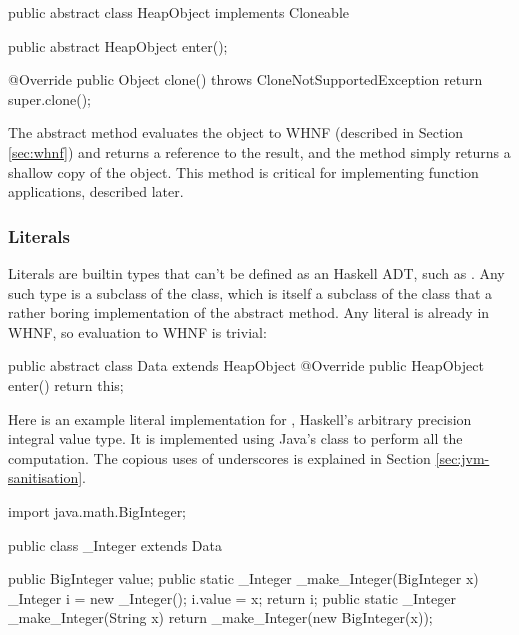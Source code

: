 \documentclass[dissertation.tex]{subfiles}
\begin{document}
{{        \begin{javafigure}
        public abstract class HeapObject implements Cloneable {
            public abstract HeapObject enter();

            @Override
            public Object clone() throws CloneNotSupportedException {
                return super.clone();
            }
        }
        \end{javafigure}

        The abstract  method evaluates the object to WHNF (described in Section \ref{sec:whnf}) and returns a reference to the result, and the  method simply returns a shallow copy of the object. This method is critical for implementing function applications, described later.

        \subsubsection{Literals}\label{sec:literals}
        {
            Literals are builtin types that can't be defined as an Haskell ADT, such as . Any such type is a subclass of the  class, which is itself a subclass of the  class that a rather boring implementation of the abstract  method. Any literal is already in WHNF, so evaluation to WHNF is trivial:

            \begin{javafigure}
            public abstract class Data extends HeapObject {
                @Override
                public HeapObject enter() {
                    return this;
                }
            }
            \end{javafigure}

            Here is an example literal implementation for , Haskell's arbitrary precision integral value type. It is implemented using Java's  class to perform all the computation. The copious uses of underscores is explained in Section \ref{sec:jvm-sanitisation}.

            \begin{javafigure}
            import java.math.BigInteger;

            public class _Integer extends Data {
                public BigInteger value;
                public static _Integer _make_Integer(BigInteger x) {
                    _Integer i = new _Integer();
                    i.value = x;
                    return i;
                }
                public static _Integer _make_Integer(String x) {
                    return _make_Integer(new BigInteger(x));
                }

}
\end{javafigure}}}}
\end{document}
